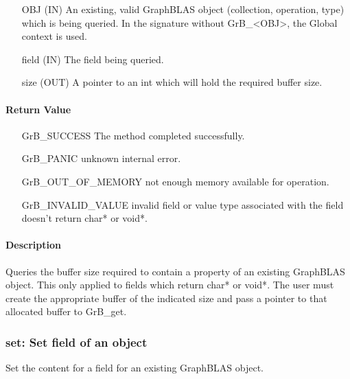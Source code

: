 \begin{itemize}[leftmargin=1.1in]
    \item[{\sf OBJ}] ({\sf IN}) An existing, valid GraphBLAS object (collection, operation, type) which is being queried.
                                In the signature without {\sf GrB\_<OBJ>}, the Global context is used.
    \item[{\sf field}] ({\sf IN}) The field being queried.
    \item[{\sf size}] ({\sf OUT}) A pointer to an int which will hold the required buffer size.
\end{itemize}

\paragraph{Return Value}

\begin{itemize}[leftmargin=2.1in]
\item[{\sf GrB\_SUCCESS}]  The method completed successfully.
\item[{\sf GrB\_PANIC}]             unknown internal error.
\item[{\sf GrB\_OUT\_OF\_MEMORY}]          not enough memory available for operation.
\item[{\sf GrB\_INVALID\_VALUE}]    invalid field or value type associated with the field
                                    doesn't return {\sf char*} or {\sf void*}.
\end{itemize}

\paragraph{Description}

Queries the buffer size required to contain a property of an existing GraphBLAS object.
This only applied to {\sf field}s which return {\sf char*} or {\sf void*}.
The user must create the appropriate buffer of the indicated size and pass a pointer to
that allocated buffer to {\sf GrB\_get}.

\subsubsection{{\sf set}: Set field of an object}

Set the content for a field for an existing GraphBLAS object.

\paragraph{\syntax}

